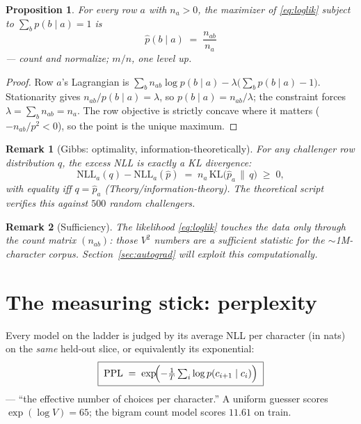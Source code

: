 \documentclass[11pt]{article}
\newtheorem{proposition}{Proposition}
\newtheorem{remark}{Remark}
\begin{document}
\begin{proposition}
For every row $a$ with $n_a > 0$, the maximizer of \eqref{eq:loglik}
subject to $\sum_b p(b \mid a) = 1$ is
\begin{equation}
  \boxed{\;\hat{p}(b \mid a) \;=\; \frac{n_{ab}}{n_a}\;}
  \label{eq:counts}
\end{equation}
--- count and normalize; $m/n$, one level up.
\end{proposition}

\begin{proof}
Row $a$'s Lagrangian is
$\sum_b n_{ab} \log p(b\mid a) - \lambda\bigl(\sum_b p(b \mid a)-1\bigr)$.
Stationarity gives $n_{ab}/p(b \mid a) = \lambda$, so
$p(b \mid a) = n_{ab}/\lambda$; the constraint forces
$\lambda = \sum_b n_{ab} = n_a$. The row objective is strictly concave
where it matters ($-n_{ab}/p^2 < 0$), so the point is the unique
maximum.
\end{proof}

\begin{remark}[Gibbs: optimality, information-theoretically]
For any challenger row distribution $q$, the excess NLL is exactly a
KL divergence:
\begin{equation}
  \mathrm{NLL}_a(q) - \mathrm{NLL}_a(\hat{p})
  \;=\; n_a\,\mathrm{KL}\bigl(\hat{p}_a \,\|\, q\bigr) \;\ge\; 0,
  \label{eq:gibbs}
\end{equation}
with equality iff $q = \hat{p}_a$ (Theory/information-theory). The
theoretical script verifies this against $500$ random challengers.
\end{remark}

\begin{remark}[Sufficiency]
The likelihood \eqref{eq:loglik} touches the data only through the
count matrix $(n_{ab})$: those $V^2$ numbers are a sufficient statistic
for the $\sim$1M-character corpus. Section~\ref{sec:autograd} will
exploit this computationally.
\end{remark}

\section{The measuring stick: perplexity}

Every model on the ladder is judged by its average NLL per character
(in nats) on the \emph{same} held-out slice, or equivalently its
exponential:
\begin{equation}
  \boxed{\;\mathrm{PPL} \;=\; \exp\!\Bigl(-\tfrac1T
  \textstyle\sum_i \log p(c_{i+1}\mid c_i)\Bigr)\;}
  \label{eq:ppl}
\end{equation}
--- ``the effective number of choices per character.'' A uniform
guesser scores $\exp(\log V) = 65$; the bigram count model scores
$11.61$ on train.
\end{document}
